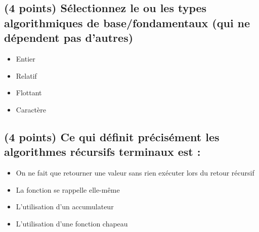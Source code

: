 \documentclass[11pt,a4paper]{article}
\begin{document}
\MakeExamTitle                   %




\renewcommand{\thesubsection}{\arabic{subsection}} %




\subsection{(4 points) Sélectionnez le ou les types algorithmiques de base/fondamentaux (qui ne dépendent pas d'autres) }

\begin{itemize}
  \item[\checkmark] Entier \\ %
  \item[\CaseCoche] Relatif \\
  \item[\checkmark] Flottant \\ %
  \item[\checkmark] Caractère \\ %
\end{itemize}


\bigskip


\subsection{(4 points) Ce qui définit précisément les algorithmes récursifs terminaux est : }

\begin{itemize}
  \item[\checkmark] On ne fait que retourner une valeur sans rien exécuter lors du retour récursif \\ %
  \item[\CaseCoche] La fonction se rappelle elle-même \\
  \item[\CaseCoche] L'utilisation d'un accumulateur \\
  \item[\CaseCoche] L'utilisation d'une fonction chapeau \\
\end{itemize}
\end{document}

